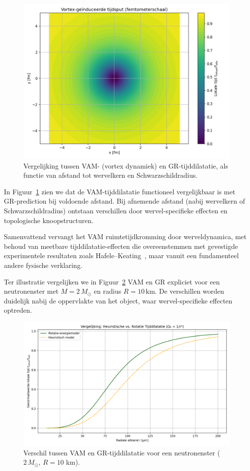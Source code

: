\begin{figure}[ht!]
    \centering
    \includegraphics[width=0.7\linewidth]{images/02-RadialProfileOfLocalTimeDilation_Vortex-Induced_Time_Well_nl}
    \caption{Vergelijking tussen VAM- (vortex dynamiek) en GR-tijddilatatie, als functie van afstand tot wervelkern en Schwarzschildradius.}
    \label{fig:vergelijking_VAMGR}
\end{figure}

In Figuur~\ref{fig:vergelijking_VAMGR} zien we dat de VAM-tijddilatatie functioneel vergelijkbaar is met GR-prediction bij voldoende afstand. Bij afnemende afstand (nabij wervelkern of Schwarzschildradius) ontstaan verschillen door wervel-specifieke effecten en topologische knoopstructuren.

Samenvattend vervangt het VAM ruimtetijdkromming door werveldynamica, met behoud van meetbare tijddilatatie-effecten die overeenstemmen met gevestigde experimentele resultaten zoals Hafele–Keating~\cite{hafele1972around}, maar vanuit een fundamenteel andere fysische verklaring.


Ter illustratie vergelijken we in Figuur~\ref{fig:vergelijkingVAMGR} VAM en GR expliciet voor een neutronenster met $M = 2\,M_\odot$ en radius $R = 10\,\text{km}$. De verschillen worden duidelijk nabij de oppervlakte van het object, waar wervel-specifieke effecten optreden.

\begin{figure}[ht!]
    \centering
    \includegraphics[width=0.7\linewidth]{images/04-RotationalVsHeuristicTimeDilation_nl}
    \caption{Verschil tussen VAM en GR-tijddilatatie voor een neutronenster ($2\,M_\odot$, $R=10$ km).}
    \label{fig:vergelijkingVAMGR}
\end{figure}


